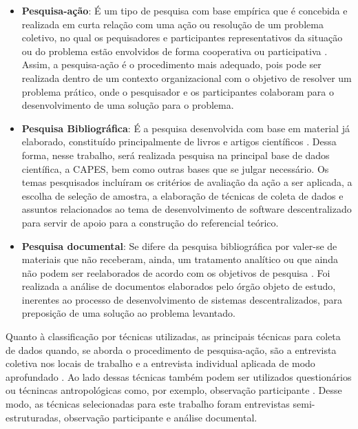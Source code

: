 \begin{itemize}
	\item \textbf{Pesquisa-ação}: É um tipo de pesquisa com base empírica que é concebida e realizada em curta relação com uma ação ou resolução de um problema coletivo, no qual os pequisadores e participantes representativos da situação ou do problema estão envolvidos de forma cooperativa ou participativa \cite{thiollent2011metodologia}. Assim, a pesquisa-ação é o procedimento mais adequado, pois pode ser realizada dentro de um contexto organizacional com o objetivo de resolver um problema prático, onde o pesquisador e os participantes colaboram para o desenvolvimento de uma solução para o problema.
	\item \textbf{Pesquisa Bibliográfica}: É a pesquisa desenvolvida com base em
	material já elaborado, constituído principalmente de livros e artigos científicos \cite{gil2002}. Dessa forma, nesse trabalho, será realizada pesquisa na principal base de dados científica, a CAPES, bem como outras bases que se julgar necessário. Os temas pesquisados incluíram os critérios de avaliação da ação a ser aplicada, a escolha de seleção de amostra, a elaboração de técnicas de coleta de dados e assuntos relacionados ao tema de desenvolvimento de software descentralizado para servir de apoio para a construção do referencial teórico.
	\item \textbf{Pesquisa documental}: Se difere da pesquisa bibliográfica por valer-se de materiais que não receberam, ainda, um tratamento analítico ou que ainda não podem ser reelaborados de acordo com os objetivos de pesquisa \cite{gil2002}. Foi realizada a análise de documentos elaborados pelo órgão objeto de estudo, inerentes ao processo de desenvolvimento de sistemas descentralizados, para preposição de uma solução ao problema levantado.
\end{itemize}

Quanto à classificação por técnicas utilizadas, as principais técnicas para coleta de dados quando, se aborda o procedimento de pesquisa-ação, são a entrevista coletiva nos locais de trabalho e a entrevista individual aplicada de modo aprofundado \cite{thiollent2011metodologia}. Ao lado dessas técnicas também podem ser utilizados questionários ou técnincas antropológicas como, por exemplo, observação participante \cite{thiollent2011metodologia}. Desse modo, as técnicas selecionadas para este trabalho foram entrevistas semi-estruturadas, observação participante e análise documental.

